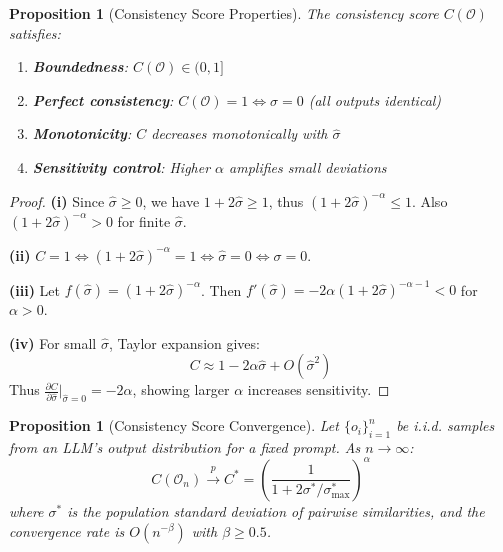 \documentclass{article}
\newtheorem{proposition}[theorem]{Proposition}
\begin{document}
\begin{proposition}[Consistency Score Properties]
\label{prop:consistency-properties}
The consistency score $C(\mathcal{O})$ satisfies:
\begin{enumerate}
    \item[(i)] \textbf{Boundedness}: $C(\mathcal{O}) \in (0, 1]$
    \item[(ii)] \textbf{Perfect consistency}: $C(\mathcal{O}) = 1 \Leftrightarrow \sigma = 0$ (all outputs identical)
    \item[(iii)] \textbf{Monotonicity}: $C$ decreases monotonically with $\hat{\sigma}$
    \item[(iv)] \textbf{Sensitivity control}: Higher $\alpha$ amplifies small deviations
\end{enumerate}
\end{proposition}

\begin{proof}
\textbf{(i)} Since $\hat{\sigma} \geq 0$, we have $1 + 2\hat{\sigma} \geq 1$, thus $(1 + 2\hat{\sigma})^{-\alpha} \leq 1$. Also $(1 + 2\hat{\sigma})^{-\alpha} > 0$ for finite $\hat{\sigma}$.

\textbf{(ii)} $C = 1 \Leftrightarrow (1 + 2\hat{\sigma})^{-\alpha} = 1 \Leftrightarrow \hat{\sigma} = 0 \Leftrightarrow \sigma = 0$.

\textbf{(iii)} Let $f(\hat{\sigma}) = (1 + 2\hat{\sigma})^{-\alpha}$. Then $f'(\hat{\sigma}) = -2\alpha(1 + 2\hat{\sigma})^{-\alpha-1} < 0$ for $\alpha > 0$.

\textbf{(iv)} For small $\hat{\sigma}$, Taylor expansion gives:
\begin{equation}
    C \approx 1 - 2\alpha\hat{\sigma} + O(\hat{\sigma}^2)
\end{equation}
Thus $\frac{\partial C}{\partial \hat{\sigma}}\big|_{\hat{\sigma}=0} = -2\alpha$, showing larger $\alpha$ increases sensitivity.
\end{proof}

\begin{proposition}[Consistency Score Convergence]
\label{prop:convergence}
Let $\{o_i\}_{i=1}^n$ be i.i.d. samples from an LLM's output distribution for a fixed prompt. As $n \to \infty$:
\begin{equation}
    C(\mathcal{O}_n) \xrightarrow{p} C^* = \left(\frac{1}{1 + 2\sigma^*/\sigma_{\max}^*}\right)^\alpha
\end{equation}
where $\sigma^*$ is the population standard deviation of pairwise similarities, and the convergence rate is $O(n^{-\beta})$ with $\beta \geq 0.5$.
\end{proposition}
\end{document}
